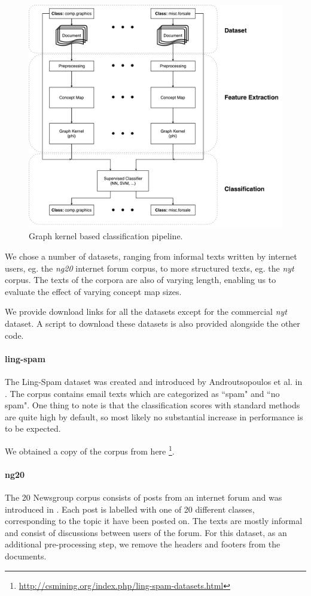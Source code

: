 \begin{figure}[htb!]
\centering\includegraphics[width=0.6\linewidth]{assets/figures/approach.pdf}
\caption{Graph kernel based classification pipeline.}
\end{figure}

We chose a number of datasets, ranging from informal texts written by internet users, eg.  the \textit{ng20} internet forum corpus, to more structured texts, eg. the \textit{nyt} corpus.
The texts of the corpora are also of varying length, enabling us to evaluate the effect of varying concept map sizes.

We provide download links for all the datasets except for the commercial \textit{nyt} dataset.
A script to download these datasets is also provided alongside the other code.

\paragraph{ling-spam}
The Ling-Spam dataset was created and introduced by Androutsopoulos et al. in  \cite{Androutsopoulos2000}.
The corpus contains email texts which are categorized as ``spam" and ``no spam".
One thing to note is that the classification scores with standard methods are quite high by default, so most likely no substantial increase in performance is to be expected.

We obtained a copy of the corpus from here \footnote{\url{http://csmining.org/index.php/ling-spam-datasets.html}}.


\paragraph{ng20}
The 20 Newsgroup corpus consists of posts from an internet forum and was introduced in \cite{Lang}. Each post is labelled with one of 20 different classes, corresponding to the topic it have been posted on. The texts are mostly informal and consist of discussions between users of the forum.
For this dataset, as an additional pre-processing step, we remove the headers and footers from the documents.

